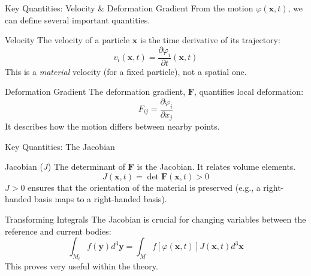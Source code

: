 \documentclass{beamer}
\begin{document}
\begin{frame}{Key Quantities: Velocity & Deformation Gradient}
    From the motion $\varphi(\mathbf{x}, t)$, we can define several important quantities.

    \begin{block}{Velocity}
        The velocity of a particle $\mathbf{x}$ is the time derivative of its trajectory:
        $$ v_{i}(\mathbf{x},t) = \frac{\partial\varphi_{i}}{\partial t}(\mathbf{x},t) $$
        This is a \textit{material} velocity (for a fixed particle), not a spatial one.
    \end{block}
    \pause
    
    \begin{block}{Deformation Gradient}
        The deformation gradient, $\mathbf{F}$, quantifies local deformation:
        $$ F_{ij} = \frac{\partial\varphi_{i}}{\partial x_{j}} $$
        It describes how the motion differs between nearby points.
    \end{block}
\end{frame}

\begin{frame}{Key Quantities: The Jacobian}
    \begin{block}{Jacobian ($J$)}
        The determinant of $\mathbf{F}$ is the Jacobian. It relates volume elements.
        $$ J(\mathbf{x},t) = \det \mathbf{F}(\mathbf{x},t) > 0 $$
        $J>0$ ensures that the orientation of the material is preserved (e.g., a right-handed basis maps to a right-handed basis).
    \end{block}
    \pause
    \begin{exampleblock}{Transforming Integrals}
        The Jacobian is crucial for changing variables between the reference and current bodies:
        $$ \int_{M_{t}}f(\mathbf{y})d^{3}\mathbf{y} = \int_{M}f[\varphi(\mathbf{x},t)]J(\mathbf{x},t)d^{3}\mathbf{x} $$
        This proves very useful within the theory.
    \end{exampleblock}
\end{frame}

\end{document}
